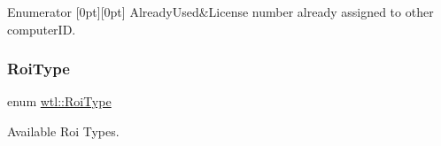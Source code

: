 \begin{DoxyEnumFields}{Enumerator}
[0pt][0pt]{}\mbox{\label{namespacewtl_a74cc3b258b8e82a1d6e032fb4c937353a398fd509996a85a546d9214e526c2e62}} 
Already\+Used&License number already assigned to other computer\+ID. \\
\hline

\end{DoxyEnumFields}
\mbox{\label{namespacewtl_aeaf0390c682c56122c5c9c43b5c2cc65}} 
\subsubsection{\texorpdfstring{Roi\+Type}{RoiType}}
{\footnotesize\ttfamily enum \hyperlink{namespacewtl_aeaf0390c682c56122c5c9c43b5c2cc65}{wtl\+::\+Roi\+Type}\hspace{0.3cm}{\ttfamily [strong]}}



Available Roi Types. 

